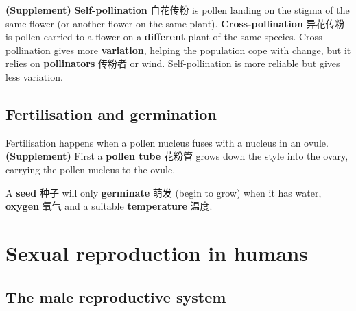 \documentclass[11pt]{article}
\begin{document}
\textbf{(Supplement)} \textbf{Self-pollination} 自花传粉 is pollen landing on the stigma of the same flower (or another flower on the same plant). \textbf{Cross-pollination} 异花传粉 is pollen carried to a flower on a \textbf{different} plant of the same species. Cross-pollination gives more \textbf{variation}, helping the population cope with change, but it relies on \textbf{pollinators} 传粉者 or wind. Self-pollination is more reliable but gives less variation.

\subsection*{Fertilisation and germination}

Fertilisation happens when a pollen nucleus fuses with a nucleus in an ovule. \textbf{(Supplement)} First a \textbf{pollen tube} 花粉管 grows down the style into the ovary, carrying the pollen nucleus to the ovule.

A \textbf{seed} 种子 will only \textbf{germinate} 萌发 (begin to grow) when it has water, \textbf{oxygen} 氧气 and a suitable \textbf{temperature} 温度.

\section*{Sexual reproduction in humans}

\subsection*{The male reproductive system}

\begin{center}
\end{center}
\end{document}
